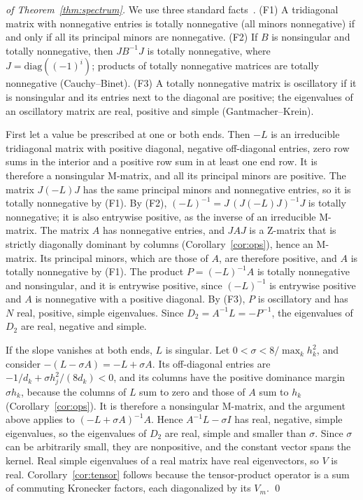 \begin{proof}[of Theorem~\ref{thm:spectrum}]
We use three standard facts~\cite{gantmacher2002oscillation,fallat2011totally}. (F1) A tridiagonal matrix
with nonnegative entries is totally nonnegative (all minors nonnegative) if and only if all its principal
minors are nonnegative. (F2) If $B$ is nonsingular and totally nonnegative, then $JB^{-1}J$ is totally
nonnegative, where $J=\mathrm{diag}((-1)^i)$; products of totally nonnegative matrices are totally
nonnegative (Cauchy--Binet). (F3) A totally nonnegative matrix is oscillatory if it is nonsingular and its
entries next to the diagonal are positive; the eigenvalues of an oscillatory matrix are real, positive and
simple (Gantmacher--Krein).

First let a value be prescribed at one or both ends. Then $-L$ is an irreducible tridiagonal matrix with
positive diagonal, negative off-diagonal entries, zero row sums in the interior and a positive row sum in at
least one end row. It is therefore a nonsingular M-matrix, and all its principal minors are positive. The
matrix $J(-L)J$ has the same principal minors and nonnegative entries, so it is totally nonnegative by (F1).
By (F2), $(-L)^{-1}=J\,(J(-L)J)^{-1}J$ is totally nonnegative; it is also entrywise positive, as the inverse
of an irreducible M-matrix. The matrix $A$ has nonnegative entries, and $JAJ$ is a Z-matrix that is strictly
diagonally dominant by columns (Corollary~\ref{cor:ops}), hence an M-matrix. Its principal minors, which are
those of $A$, are therefore positive, and $A$ is totally nonnegative by (F1). The product $P=(-L)^{-1}A$ is
totally nonnegative and nonsingular, and it is entrywise positive, since $(-L)^{-1}$ is entrywise positive
and $A$ is nonnegative with a positive diagonal. By (F3), $P$ is oscillatory and has $N$ real, positive,
simple eigenvalues. Since $D_2=A^{-1}L=-P^{-1}$, the eigenvalues of $D_2$ are real, negative and simple.

If the slope vanishes at both ends, $L$ is singular. Let $0<\sigma<8/\max_kh_k^2$, and consider
$-(L-\sigma A)=-L+\sigma A$. Its off-diagonal entries are $-1/d_k+\sigma h_j^2/(8d_k)<0$, and its columns have
the positive dominance margin $\sigma h_k$, because the columns of $L$ sum to zero and those of $A$ sum to
$h_k$ (Corollary~\ref{cor:ops}). It is therefore a nonsingular M-matrix, and the argument above applies to
$(-L+\sigma A)^{-1}A$. Hence $A^{-1}L-\sigma I$ has real, negative, simple eigenvalues, so the eigenvalues of
$D_2$ are real, simple and smaller than $\sigma$. Since $\sigma$ can be arbitrarily small, they are
nonpositive, and the constant vector spans the kernel. Real simple eigenvalues of a real matrix have real
eigenvectors, so $V$ is real. Corollary~\ref{cor:tensor} follows because the tensor-product operator is a
sum of commuting Kronecker factors, each diagonalized by its $V_m$. \qed
\end{proof}
